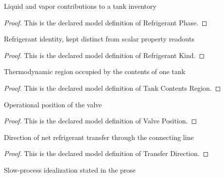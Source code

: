 \begin{definition}
  \label{def:physics:phyx-mini-0444:phyxminiproblems-problemphyxmini0444-refrigerantphase}
  Liquid and vapor contributions to a tank inventory
\end{definition}
\begin{proof}
  This is the declared model definition of Refrigerant Phase.
\end{proof}
\begin{definition}
  \label{def:physics:phyx-mini-0444:phyxminiproblems-problemphyxmini0444-refrigerantkind}
  Refrigerant identity, kept distinct from scalar property readouts
\end{definition}
\begin{proof}
  This is the declared model definition of Refrigerant Kind.
\end{proof}
\begin{definition}
  \label{def:physics:phyx-mini-0444:phyxminiproblems-problemphyxmini0444-tankcontentsregion}
  Thermodynamic region occupied by the contents of one tank
\end{definition}
\begin{proof}
  This is the declared model definition of Tank Contents Region.
\end{proof}
\begin{definition}
  \label{def:physics:phyx-mini-0444:phyxminiproblems-problemphyxmini0444-valveposition}
  Operational position of the valve
\end{definition}
\begin{proof}
  This is the declared model definition of Valve Position.
\end{proof}
\begin{definition}
  \label{def:physics:phyx-mini-0444:phyxminiproblems-problemphyxmini0444-transferdirection}
  Direction of net refrigerant transfer through the connecting line
\end{definition}
\begin{proof}
  This is the declared model definition of Transfer Direction.
\end{proof}
\begin{definition}
  \label{def:physics:phyx-mini-0444:phyxminiproblems-problemphyxmini0444-transferregime}
  Slow-process idealization stated in the prose
\end{definition}
